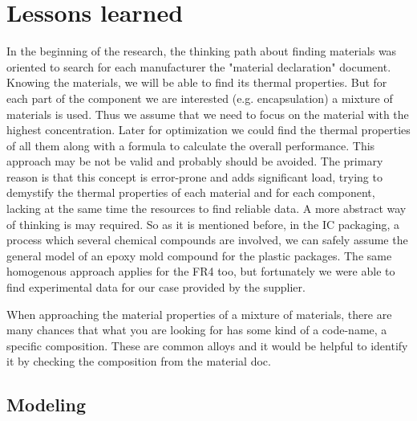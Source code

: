 \documentclass[final]{cubedoc}
\begin{document}
	
	
	\section{Lessons learned}\label{lessons_learned}
	
	In the beginning of the research, the thinking path about finding materials was oriented to search for each manufacturer the "material declaration" document. Knowing the materials, we will be able to find its thermal properties. But for each part of the component we are interested (e.g. encapsulation) a mixture of materials is used. Thus we assume that we need to focus on the material with the highest concentration. Later for optimization we could find the thermal properties of all them along with a formula to calculate the overall performance. This approach may be not be valid and probably should be avoided. The primary reason is that this concept is error-prone and adds significant load, trying to demystify the thermal properties of each material and for each component, lacking at the same time the resources to find reliable data. A more abstract way of thinking is may required. So as it is mentioned before, in the IC packaging, a process which several chemical compounds are involved, we can safely assume the general model of an epoxy mold compound for the plastic packages. The same homogenous approach applies for the FR4 too, but fortunately we were able to find experimental data for our case provided by the supplier.
	
	
	When approaching the material properties of a mixture of materials, there are many chances that what you are looking for has some kind of a code-name, a specific composition. These are common alloys and it would be helpful to identify it by checking the composition from the material doc. 
	
	
	\subsection{Modeling}
	\label{subsec:modeling}
	
\end{document}
